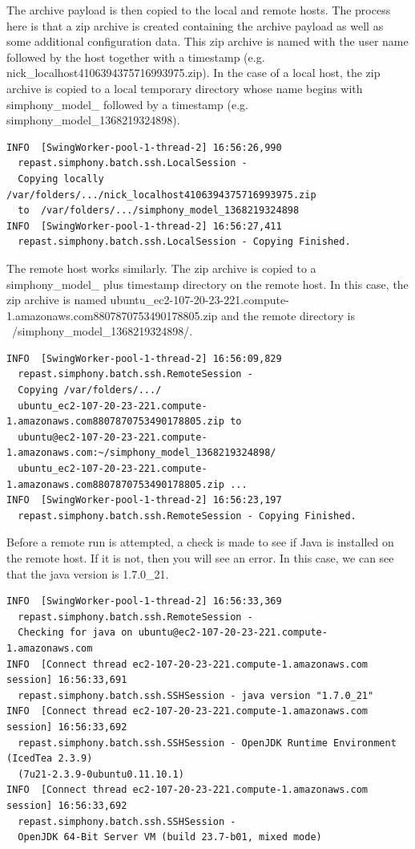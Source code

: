 \documentclass[11pt]{amsart}
\begin{document}
The archive payload is then copied to the local and remote hosts. The process here is that a zip archive is created containing the archive payload as well as some additional configuration data. This zip archive is named with the user name followed by the host together with a timestamp (e.g. nick\_localhost4106394375716993975.zip). In the case of a local host, the zip archive is copied to a local temporary directory whose name begins with simphony\_model\_ followed by a timestamp (e.g. simphony\_model\_1368219324898). 

\begin{verbatim}
INFO  [SwingWorker-pool-1-thread-2] 16:56:26,990 
  repast.simphony.batch.ssh.LocalSession - 
  Copying locally /var/folders/.../nick_localhost4106394375716993975.zip
  to  /var/folders/.../simphony_model_1368219324898
INFO  [SwingWorker-pool-1-thread-2] 16:56:27,411 
  repast.simphony.batch.ssh.LocalSession - Copying Finished.
\end{verbatim}

The remote host works similarly. The zip archive is copied to a simphony\_model\_ plus timestamp directory on the remote host. In this case, the zip archive is named  ubuntu\_ec2-107-20-23-221.compute-1.amazonaws.com8807870753490178805.zip and the remote directory is ~/simphony\_model\_1368219324898/.

\begin{verbatim}
INFO  [SwingWorker-pool-1-thread-2] 16:56:09,829 
  repast.simphony.batch.ssh.RemoteSession - 
  Copying /var/folders/.../
  ubuntu_ec2-107-20-23-221.compute-1.amazonaws.com8807870753490178805.zip to 
  ubuntu@ec2-107-20-23-221.compute-1.amazonaws.com:~/simphony_model_1368219324898/
  ubuntu_ec2-107-20-23-221.compute-1.amazonaws.com8807870753490178805.zip ...
INFO  [SwingWorker-pool-1-thread-2] 16:56:23,197 
  repast.simphony.batch.ssh.RemoteSession - Copying Finished.
\end{verbatim}

Before a remote run is attempted,  a check is made to see if Java is installed on the remote host. If it is not, then you will see an error. In this case, we can see that the java version is 1.7.0\_21.

\begin{verbatim}
INFO  [SwingWorker-pool-1-thread-2] 16:56:33,369 
  repast.simphony.batch.ssh.RemoteSession - 
  Checking for java on ubuntu@ec2-107-20-23-221.compute-1.amazonaws.com
INFO  [Connect thread ec2-107-20-23-221.compute-1.amazonaws.com session] 16:56:33,691
  repast.simphony.batch.ssh.SSHSession - java version "1.7.0_21"
INFO  [Connect thread ec2-107-20-23-221.compute-1.amazonaws.com session] 16:56:33,692
  repast.simphony.batch.ssh.SSHSession - OpenJDK Runtime Environment (IcedTea 2.3.9)
  (7u21-2.3.9-0ubuntu0.11.10.1)
INFO  [Connect thread ec2-107-20-23-221.compute-1.amazonaws.com session] 16:56:33,692 
  repast.simphony.batch.ssh.SSHSession - 
  OpenJDK 64-Bit Server VM (build 23.7-b01, mixed mode)
\end{verbatim}
\end{document}
